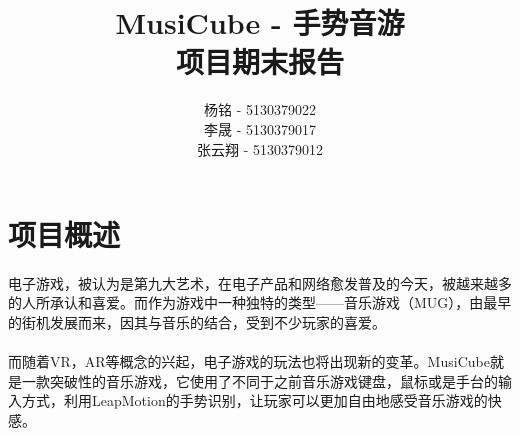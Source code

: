 \documentclass{article}
\title{MusiCube - 手势音游\\
       项目期末报告}
\author{杨铭 - 5130379022\\
        李晟 - 5130379017\\
        张云翔 - 5130379012}
\begin{document}
\maketitle
\tableofcontents
\newpage
\section{项目概述}
\paragraph{}
电子游戏，被认为是第九大艺术，在电子产品和网络愈发普及的今天，被越来越多的人所承认和喜爱。而作为游戏中一种独特的类型——音乐游戏（MUG），由最早的街机发展而来，因其与音乐的结合，受到不少玩家的喜爱。
\paragraph{}
而随着VR，AR等概念的兴起，电子游戏的玩法也将出现新的变革。MusiCube就是一款突破性的音乐游戏，它使用了不同于之前音乐游戏键盘，鼠标或是手台的输入方式，利用LeapMotion的手势识别，让玩家可以更加自由地感受音乐游戏的快感。
\end{document}
